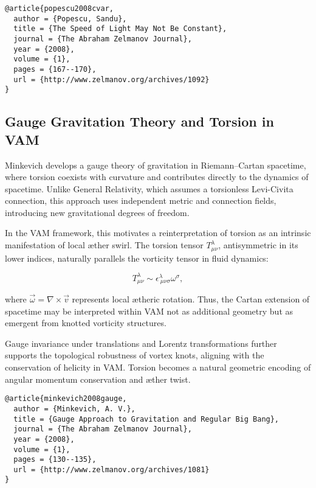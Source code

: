 \begin{verbatim}
@article{popescu2008cvar,
  author = {Popescu, Sandu},
  title = {The Speed of Light May Not Be Constant},
  journal = {The Abraham Zelmanov Journal},
  year = {2008},
  volume = {1},
  pages = {167--170},
  url = {http://www.zelmanov.org/archives/1092}
}
\end{verbatim}

\subsection{Gauge Gravitation Theory and Torsion in VAM}

Minkevich \cite{minkevich2008gauge} develops a gauge theory of gravitation in Riemann–Cartan spacetime, where torsion coexists with curvature and contributes directly to the dynamics of spacetime. Unlike General Relativity, which assumes a torsionless Levi-Civita connection, this approach uses independent metric and connection fields, introducing new gravitational degrees of freedom.

In the VAM framework, this motivates a reinterpretation of torsion as an intrinsic manifestation of local æther swirl. The torsion tensor $T^\lambda_{\mu\nu}$, antisymmetric in its lower indices, naturally parallels the vorticity tensor in fluid dynamics:

\begin{equation}
T^\lambda_{\mu\nu} \sim \epsilon^{\lambda}_{\ \mu\nu\sigma} \omega^\sigma,
\end{equation}

where $\vec{\omega} = \nabla \times \vec{v}$ represents local ætheric rotation. Thus, the Cartan extension of spacetime may be interpreted within VAM not as additional geometry but as emergent from knotted vorticity structures.

Gauge invariance under translations and Lorentz transformations further supports the topological robustness of vortex knots, aligning with the conservation of helicity in VAM. Torsion becomes a natural geometric encoding of angular momentum conservation and æther twist.

\begin{verbatim}
@article{minkevich2008gauge,
  author = {Minkevich, A. V.},
  title = {Gauge Approach to Gravitation and Regular Big Bang},
  journal = {The Abraham Zelmanov Journal},
  year = {2008},
  volume = {1},
  pages = {130--135},
  url = {http://www.zelmanov.org/archives/1081}
}
\end{verbatim}


